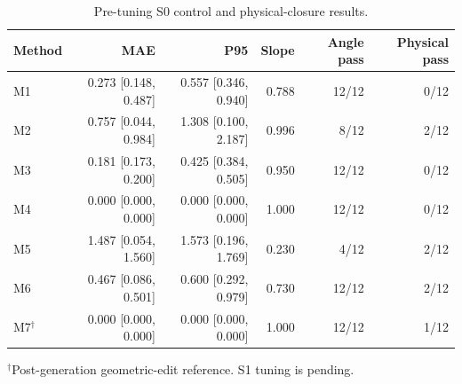 \begin{table}[t]
\centering
\caption{Pre-tuning S0 control and physical-closure results.}
\label{tab:s0_physical_closure}
\begin{tabular}{lrrrrr}
\toprule
Method & MAE & P95 & Slope & Angle pass & Physical pass \\
\midrule
M1 & 0.273 [0.148, 0.487] & 0.557 [0.346, 0.940] & 0.788 & 12/12 & 0/12 \\
M2 & 0.757 [0.044, 0.984] & 1.308 [0.100, 2.187] & 0.996 & 8/12 & 2/12 \\
M3 & 0.181 [0.173, 0.200] & 0.425 [0.384, 0.505] & 0.950 & 12/12 & 0/12 \\
M4 & 0.000 [0.000, 0.000] & 0.000 [0.000, 0.000] & 1.000 & 12/12 & 0/12 \\
M5 & 1.487 [0.054, 1.560] & 1.573 [0.196, 1.769] & 0.230 & 4/12 & 2/12 \\
M6 & 0.467 [0.086, 0.501] & 0.600 [0.292, 0.979] & 0.730 & 12/12 & 2/12 \\
M7$^{\dagger}$ & 0.000 [0.000, 0.000] & 0.000 [0.000, 0.000] & 1.000 & 12/12 & 1/12 \\
\bottomrule
\end{tabular}
\begin{flushleft}\footnotesize $^{\dagger}$Post-generation geometric-edit reference. S1 tuning is pending.\end{flushleft}
\end{table}

